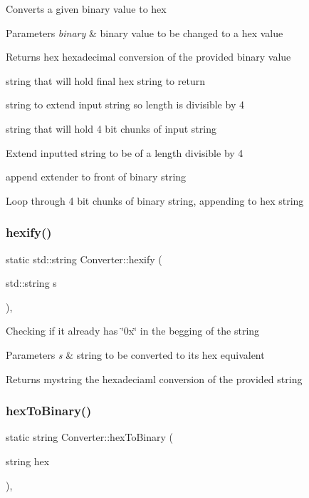 Converts a given binary value to hex 
\begin{DoxyParams}{Parameters}
{\em binary} & binary value to be changed to a hex value \\
\hline
\end{DoxyParams}
\begin{DoxyReturn}{Returns}
hex hexadecimal conversion of the provided binary value 
\end{DoxyReturn}
string that will hold final hex string to return

string to extend input string so length is divisible by 4

string that will hold 4 bit chunks of input string

Extend inputted string to be of a length divisible by 4

append extender to front of binary string

Loop through 4 bit chunks of binary string, appending to hex string \mbox{\label{class_converter_a768192ad785d9cc92a0815b85ba5653f}} 
\subsubsection{\texorpdfstring{hexify()}{hexify()}}
{\footnotesize\ttfamily static std\+::string Converter\+::hexify (\begin{DoxyParamCaption}\item[{std\+::string}]{s }\end{DoxyParamCaption})\hspace{0.3cm}{\ttfamily [inline]}, {\ttfamily [static]}}

Checking if it already has \char`\"{}0x\char`\"{} in the begging of the string 
\begin{DoxyParams}{Parameters}
{\em s} & string to be converted to it\textquotesingle{}s hex equivalent \\
\hline
\end{DoxyParams}
\begin{DoxyReturn}{Returns}
mystring the hexadeciaml conversion of the provided string 
\end{DoxyReturn}
\mbox{\label{class_converter_aabed706cd6259a3d1c5c303cf2a411ff}} 
\subsubsection{\texorpdfstring{hex\+To\+Binary()}{hexToBinary()}}
{\footnotesize\ttfamily static string Converter\+::hex\+To\+Binary (\begin{DoxyParamCaption}\item[{string}]{hex }\end{DoxyParamCaption})\hspace{0.3cm}{\ttfamily [inline]}, {\ttfamily [static]}}

